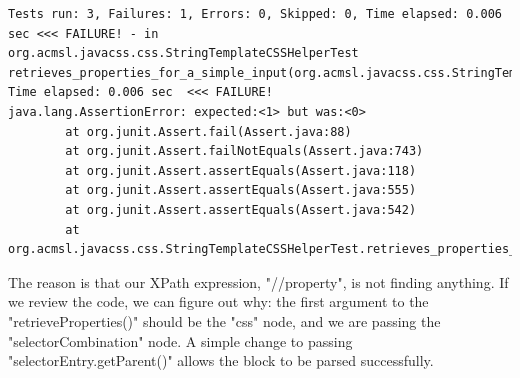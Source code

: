 \documentclass[11pt]{article}
\begin{document}
\begin{verbatim}
Tests run: 3, Failures: 1, Errors: 0, Skipped: 0, Time elapsed: 0.006 sec <<< FAILURE! - in org.acmsl.javacss.css.StringTemplateCSSHelperTest
retrieves_properties_for_a_simple_input(org.acmsl.javacss.css.StringTemplateCSSHelperTest)  Time elapsed: 0.006 sec  <<< FAILURE!
java.lang.AssertionError: expected:<1> but was:<0>
        at org.junit.Assert.fail(Assert.java:88)
        at org.junit.Assert.failNotEquals(Assert.java:743)
        at org.junit.Assert.assertEquals(Assert.java:118)
        at org.junit.Assert.assertEquals(Assert.java:555)
        at org.junit.Assert.assertEquals(Assert.java:542)
        at org.acmsl.javacss.css.StringTemplateCSSHelperTest.retrieves_properties_for_a_simple_input(StringTemplateCSSHelperTest.java:125)
\end{verbatim}

The reason is that our XPath expression, "//property", is not finding anything. If we review the code, we can figure out why: the first argument to the "retrieveProperties()" should be the "css" node, and we are passing the "selectorCombination" node.
A simple change to passing "selectorEntry.getParent()" allows the block to be parsed successfully.
\end{document}
